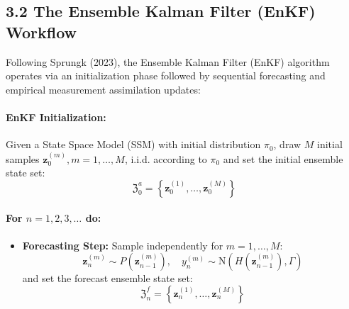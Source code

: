 \documentclass[11pt,a4paper]{article}
\begin{document}
\subsection*{3.2 The Ensemble Kalman Filter (EnKF) Workflow \cite{sprungk2023}}
Following Sprungk (2023), the Ensemble Kalman Filter (EnKF) algorithm operates via an initialization phase followed by sequential forecasting and empirical measurement assimilation updates:

\paragraph{EnKF Initialization:}
Given a State Space Model (SSM) with initial distribution $\pi_0$, draw $M$ initial samples $\mathbf{z}_0^{(m)}, m = 1, \dots, M$, i.i.d. according to $\pi_0$ and set the initial ensemble state set:
\begin{equation}
\mathfrak{Z}_0^a = \left\{ \mathbf{z}_0^{(1)}, \dots, \mathbf{z}_0^{(M)} \right\}
\end{equation}

\paragraph{For $n = 1, 2, 3, \dots$ do:}
\begin{itemize}
    \item \textbf{Forecasting Step:} Sample independently for $m = 1, \dots, M$:
    \begin{equation}
    \mathbf{z}_n^{(m)} \sim P(\mathbf{z}_{n-1}^{(m)}), \quad y_n^{(m)} \sim \mathrm{N}(H(\mathbf{z}_{n-1}^{(m)}), \Gamma)
    \end{equation}
    and set the forecast ensemble state set:
    \begin{equation}
    \mathfrak{Z}_n^f = \left\{ \mathbf{z}_n^{(1)}, \dots, \mathbf{z}_n^{(M)} \right\}
    \end{equation}
\end{itemize}
\end{document}
